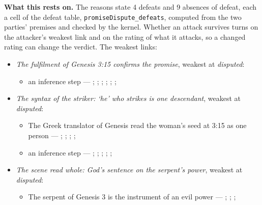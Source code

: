 \documentclass[11pt]{article}
\begin{document}
\par\noindent\textbf{What this rests on.} The reasons state 4 defeats and 9 absences of defeat, each a cell of the defeat table, \texttt{promise\allowbreak{}Dispute\_\allowbreak{}defeats}, computed from the two parties' premises and checked by the kernel. Whether an attack survives turns on the attacker's weakest link and on the rating of what it attacks, so a changed rating can change the verdict. The weakest links:
\begin{itemize}
\item \emph{The fulfilment of Genesis 3:15 confirms the promise}, weakest at \emph{disputed}:
\begin{itemize}
\item an inference step --- \cite[III.23.7]{irenaeus-against-heresies-180}; \cite[IV.40.3]{irenaeus-against-heresies-180}; \cite[42, 53]{hamilton-skull-crushing-seed-2006}; \cite[102]{keil-delitzsch-pentateuch-1866}; \cite[170]{leupold-exposition-genesis-1942}; \cite[170--171]{calvin-commentary-genesis-1847}; \cite[259--261]{westermann-genesis-1-11-1984}
\end{itemize}
\item \emph{The syntax of the striker: ‘he’ who strikes is one descendant}, weakest at \emph{disputed}:
\begin{itemize}
\item The Greek translator of Genesis read the woman’s seed at 3:15 as one person --- \cite[145]{collins-syntactical-note-1997}; \cite[144]{collins-syntactical-note-1997}; \cite{martin-earliest-messianic-1965}; \cite[300]{lewis-womans-seed-1991}; \cite[III.188]{philo-allegorical-interpretation-40}
\item an inference step --- \cite[144--146]{collins-syntactical-note-1997}; \cite[363, 364]{alexander-further-observations-1997}; \cite[166--168]{leupold-exposition-genesis-1942}; \cite[32]{hamilton-skull-crushing-seed-2006}; \cite[101]{keil-delitzsch-pentateuch-1866}; \cite[171]{calvin-commentary-genesis-1847}
\end{itemize}
\item \emph{The scene read whole: God’s sentence on the serpent’s power}, weakest at \emph{disputed}:
\begin{itemize}
\item The serpent of Genesis 3 is the instrument of an evil power --- \cite[146--147]{collins-syntactical-note-1997}; \cite[197]{woudstra-recent-translations-1971}; \cite[101--102]{keil-delitzsch-pentateuch-1866}; \cite[261]{westermann-genesis-1-11-1984}
\end{itemize}

\end{itemize}
\end{document}
